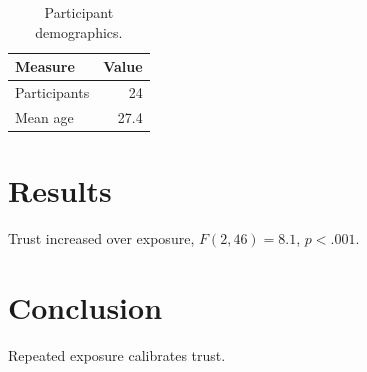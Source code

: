 \documentclass[conference]{IEEEtran}
\begin{document}
\begin{table}[t]
  \caption{Participant demographics.}
  \label{tab:demographics}
  \begin{tabular}{lr}
    \toprule
    Measure & Value \\
    \midrule
    Participants & 24 \\
    Mean age & 27.4 \\
    \bottomrule
  \end{tabular}
\end{table}

\section{Results}
Trust increased over exposure, $F(2,46) = 8.1$, $p < .001$.

\section{Conclusion}
Repeated exposure calibrates trust.



\end{document}
